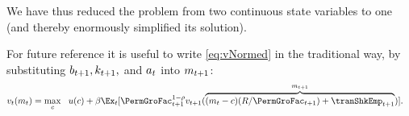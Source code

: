 We have thus reduced the problem from two continuous state variables to one (and thereby enormously simplified its solution).

For future reference it is useful to write \eqref{eq:vNormed} in the traditional way, by substituting $b_{t+1},k_{t+1},$ and $a_{t}$ into $m_{t+1}$:
\begin{equation}\begin{gathered}\begin{aligned}
      \vFunc_{\prdt}(\mNrm_{\prdt}) & = \max_{\cNrm} ~~ \uFunc(\cNrm)+ \DiscFac \Ex_{\prdt}[ \PermGroFac_{\prdt+1}^{1-\CRRA}\vFunc_{\prdt+1}(\overbrace{(\mNrm_{t}-\cNrm)(\Rfree/\PermGroFac_{t+1})+\tranShkEmp_{t+1}}^{m_{t+1}})] \label{eq:vusual}.
    \end{aligned}\end{gathered}\end{equation}

